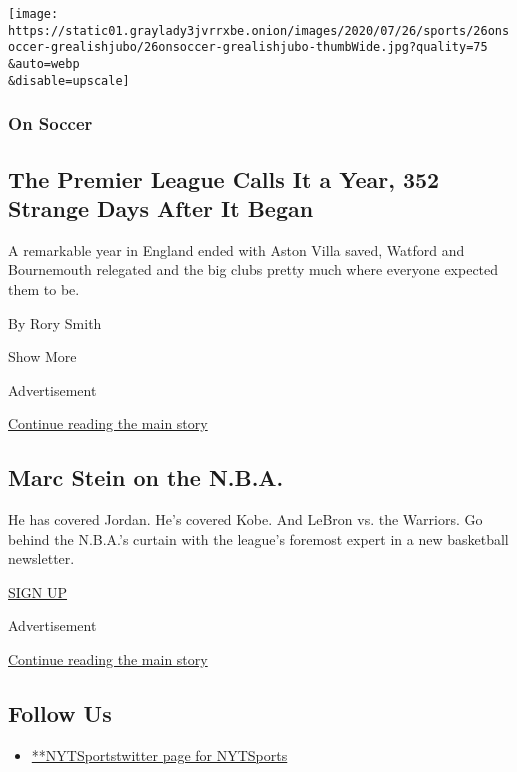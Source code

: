\begin{enumerate}
  \texttt{[image: https://static01.graylady3jvrrxbe.onion/images/2020/07/26/sports/26onsoccer-grealishjubo/26onsoccer-grealishjubo-thumbWide.jpg?quality=75\\\&auto=webp\\\&disable=upscale]}

  \hypertarget{on-soccer}{%
  \subsubsection{On Soccer}\label{on-soccer}}

  \hypertarget{the-premier-league-calls-it-a-year-352-strange-days-after-it-began}{%
  \subsection{The Premier League Calls It a Year, 352 Strange Days After
  It
  Began}\label{the-premier-league-calls-it-a-year-352-strange-days-after-it-began}}

  A remarkable year in England ended with Aston Villa saved, Watford and
  Bournemouth relegated and the big clubs pretty much where everyone
  expected them to be.

  By Rory Smith
\end{enumerate}

Show More

Advertisement

\protect\hyperlink{after-mid2}{Continue reading the main story}

\hypertarget{marc-stein-on-the-nba}{%
\subsection{Marc Stein on the N.B.A.}\label{marc-stein-on-the-nba}}

He has covered Jordan. He's covered Kobe. And LeBron vs. the Warriors.
Go behind the N.B.A.'s curtain with the league's foremost expert in a
new basketball newsletter.

\href{/newsletters/signup/MSB}{SIGN UP}

Advertisement

\protect\hyperlink{after-mktg}{Continue reading the main story}

\hypertarget{follow-us}{%
\subsection{Follow Us}\label{follow-us}}

\begin{itemize}
\tightlist
\item
  \href{https://twitter.com/NYTSports}{**NYTSportstwitter page for
  NYTSports}
\end{itemize}

